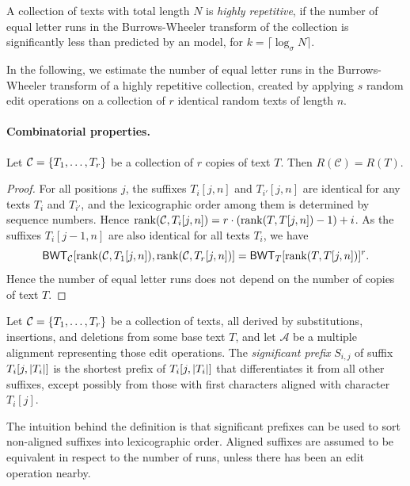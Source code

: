 \begin{definition}
A collection of texts with total length $N$ is \emph{highly repetitive}, if the number of equal letter runs in the Burrows-Wheeler transform of the collection is significantly less than predicted by an  model, for $k = \lceil \log_{\sigma} N \rceil$.
\end{definition}

In the following, we estimate the number of equal letter runs in the Burrows-Wheeler transform of a highly repetitive collection, created by applying $s$ random edit operations on a collection of $r$ identical random texts of length $n$.

\paragraph{Combinatorial properties.}

\begin{lemma}\label{lemma:runs for copies}
Let $\mathcal{C} = \{ T_{1}, \dotsc, T_{r} \}$ be a collection of $r$ copies of text $T$. Then $R(\mathcal{C}) = R(T)$.
\end{lemma}

\begin{proof}
For all positions $j$, the suffixes $T_{i}[j,n]$ and $T_{i'}[j,n]$ are identical for any texts $T_{i}$ and $T_{i'}$, and the lexicographic order among them is determined by sequence numbers. Hence $\operatorname{rank}(\mathcal{C}, T_{i}[j,n]) = r \cdot (\operatorname{rank}(T, T[j,n]) - 1) + i$. As the suffixes $T_{i}[j-1,n]$ are also identical for all texts $T_{i}$, we have
$$
\mathsf{BWT}_{\mathcal{C}}[\operatorname{rank}(\mathcal{C}, T_{1}[j,n]), \operatorname{rank}(\mathcal{C}, T_{r}[j,n])] =
\mathsf{BWT}_{T}[\operatorname{rank}(T, T[j,n])]^{r}.
$$
Hence the number of equal letter runs does not depend on the number of copies of text $T$.
\end{proof}

\begin{definition}
Let $\mathcal{C} = \{ T_{1}, \dotsc, T_{r} \}$ be a collection of texts, all derived by substitutions, insertions, and deletions from some base text $T$, and let $\mathcal{A}$ be a multiple alignment representing those edit operations. The \emph{significant prefix} $S_{i,j}$ of suffix $T_{i}[j,\lvert T_{i} \rvert]$ is the shortest prefix of $T_{i}[j,\lvert T_{i} \rvert]$ that differentiates it from all other suffixes, except possibly from those with first characters aligned with character $T_{i}[j]$.
\end{definition}

The intuition behind the definition is that significant prefixes can be used to sort non-aligned suffixes into lexicographic order. Aligned suffixes are assumed to be equivalent in respect to the number of runs, unless there has been an edit operation nearby.

